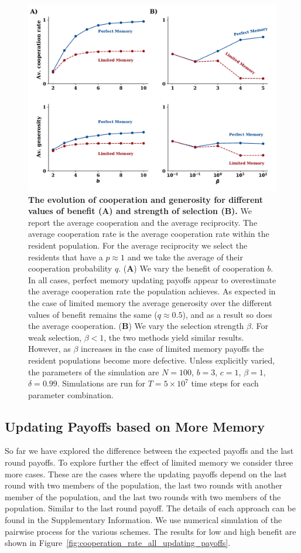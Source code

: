 \documentclass[11pt]{article}
\theoremstyle{plainCl1}
\theoremstyle{plainCl2}
\begin{document}
\begin{figure}[!htbp]
    \centering
    \includegraphics[width=.75\textwidth]{static/cooperation_rate_over_b_and_beta.pdf}
    \caption{{\bf The evolution of cooperation and generosity for different
    values of benefit (A) and strength of selection (B).} We report the average
    cooperation and the average reciprocity. The average cooperation rate is the
    average cooperation rate within the resident population. For the average
    reciprocity we select the residents that have a $p \approx 1$ and we take
    the average of their cooperation probability $q$. ({\bf A}) We vary the
    benefit of cooperation $b$. In all cases, perfect memory updating payoffs
    appear to overestimate the average cooperation rate the population achieves.
    As expected in the case of limited memory the average generosity over the
    different values of benefit remains the same ($q \approx 0.5$), and as a
    result so does the average cooperation. ({\bf B}) We vary the selection
    strength $\beta$. For weak selection, \(\beta < 1\), the two methods yield
    similar results. However, as \(\beta\) increases in the case of limited
    memory payoffs the resident populations become more defective. Unless
    explicitly varied, the parameters of the simulation are $N\!=\!100$,
    $b\!=\!3$, $c\!=\!1$, $\beta\!=\!1$, $\delta\!=\!0.99$. Simulations are run
    for $T\!=\!5\times 10^7$ time steps for each parameter
    combination.}\label{fig:cooperation_rate_over_benefit_and_beta}
\end{figure}

\subsection{Updating Payoffs based on More Memory}

So far we have explored the difference between the expected payoffs and the last
round payoffs. To explore further the effect of limited memory we consider three
more cases. These are the cases where the updating payoffs depend on  the last
round with two members of the population, the last two rounds with another
member of the population, and the last two rounds with two members of the
population. Similar to the last round payoff. The details of each approach can
be found in the Supplementary Information. We use numerical simulation of the
pairwise process for the various schemes. The results for low and high benefit
are shown in Figure~\ref{fig:cooperation_rate_all_updating_payoffs}.
\end{document}
